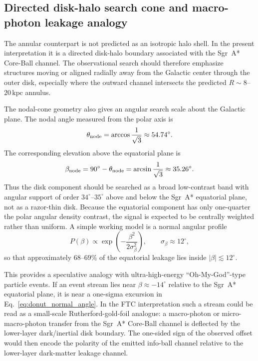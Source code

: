 \documentclass[11pt,a4paper]{article}
\newcommand{\kpc}{\mathrm{kpc}}
\begin{document}
\subsection{Directed disk-halo search cone and macro-photon leakage analogy}
\label{sec:directed_donut_search}

The annular counterpart is not predicted as an isotropic halo shell.  In the
present interpretation it is a directed disk-halo boundary associated with the
Sgr~A* Core-Ball channel.  The observational search should therefore emphasize
structures moving or aligned radially away from the Galactic center through the
outer disk, especially where the outward channel intersects the predicted
$R\sim8$--$20\,\kpc$ annulus.

The nodal-cone geometry also gives an angular search scale about the Galactic
plane.  The nodal angle measured from the polar axis is
\begin{equation}
  \theta_{\rm node}=\arccos\frac{1}{\sqrt3}\approx54.74^\circ.
\end{equation}
The corresponding elevation above the equatorial plane is
\begin{equation}
  \beta_{\rm node}
  =90^\circ-\theta_{\rm node}
  =\arcsin\frac{1}{\sqrt3}
  \approx35.26^\circ.
  \label{eq:equatorial_elevation}
\end{equation}
Thus the disk component should be searched as a broad low-contrast band with
angular support of order $34^\circ$--$35^\circ$ above and below the Sgr~A*
equatorial plane, not as a razor-thin disk.  Because the equatorial component
has only one-quarter the polar angular density contrast, the signal is expected
to be centrally weighted rather than uniform.  A simple working model is a
normal angular profile
\begin{equation}
  P(\beta)\propto
  \exp\!\left(-\frac{\beta^2}{2\sigma_\beta^2}\right),
  \qquad
  \sigma_\beta\approx12^\circ,
  \label{eq:donut_normal_angle}
\end{equation}
so that approximately $68$--$69\%$ of the equatorial leakage lies inside
$|\beta|\lesssim12^\circ$.

This provides a speculative analogy with ultra-high-energy ``Oh-My-God''-type
particle events.  If an event stream lies near $\beta\approx-14^\circ$
relative to the Sgr~A* equatorial plane, it is near a one-sigma excursion in
Eq.~\eqref{eq:donut_normal_angle}.  In the FTC interpretation such a stream
could be read as a small-scale Rutherford-gold-foil analogue: a macro-photon
or micro-macro-photon transfer from the Sgr~A* Core-Ball channel is deflected
by the lower-layer dark/inertial disk boundary.  The one-sided sign of the
observed offset would then encode the polarity of the emitted info-ball channel
relative to the lower-layer dark-matter leakage channel.
\end{document}
